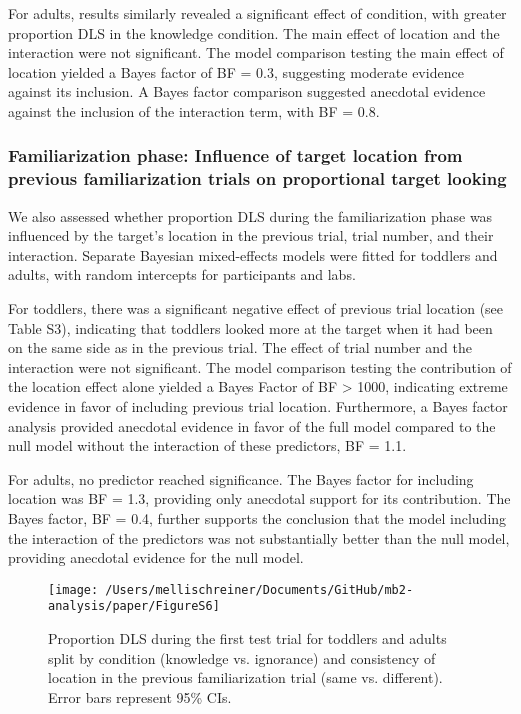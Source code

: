 \documentclass[
  man, donotrepeattitle,floatsintext]{apa6}
\begin{document}
For adults, results similarly revealed a significant effect of condition, with greater proportion DLS in the knowledge condition. The main effect of location and the interaction were not significant. The model comparison testing the main effect of location yielded a Bayes factor of BF = 0.3, suggesting moderate evidence against its inclusion. A Bayes factor comparison suggested anecdotal evidence against the inclusion of the interaction term, with BF = 0.8.

\subsubsection{Familiarization phase: Influence of target location from previous familiarization trials on proportional target looking}\label{familiarization-phase-influence-of-target-location-from-previous-familiarization-trials-on-proportional-target-looking}

We also assessed whether proportion DLS during the familiarization phase was influenced by the target's location in the previous trial, trial number, and their interaction. Separate Bayesian mixed-effects models were fitted for toddlers and adults, with random intercepts for participants and labs.

For toddlers, there was a significant negative effect of previous trial location (see Table S3), indicating that toddlers looked more at the target when it had been on the same side as in the previous trial. The effect of trial number and the interaction were not significant. The model comparison testing the contribution of the location effect alone yielded a Bayes Factor of BF \textgreater{} 1000, indicating extreme evidence in favor of including previous trial location. Furthermore, a Bayes factor analysis provided anecdotal evidence in favor of the full model compared to the null model without the interaction of these predictors, BF = 1.1.

For adults, no predictor reached significance. The Bayes factor for including location was BF = 1.3, providing only anecdotal support for its contribution. The Bayes factor, BF = 0.4, further supports the conclusion that the model including the interaction of the predictors was not substantially better than the null model, providing anecdotal evidence for the null model.

\begin{figure}

{\centering \texttt{[image: /Users/mellischreiner/Documents/GitHub/mb2-analysis/paper/FigureS6]} 

}

\caption{Proportion DLS during the first test trial for toddlers and adults split by condition (knowledge vs. ignorance) and consistency of location in the previous familiarization trial (same vs. different). Error bars represent 95\% CIs.}\label{fig:fig11}
\end{figure}
\end{document}
